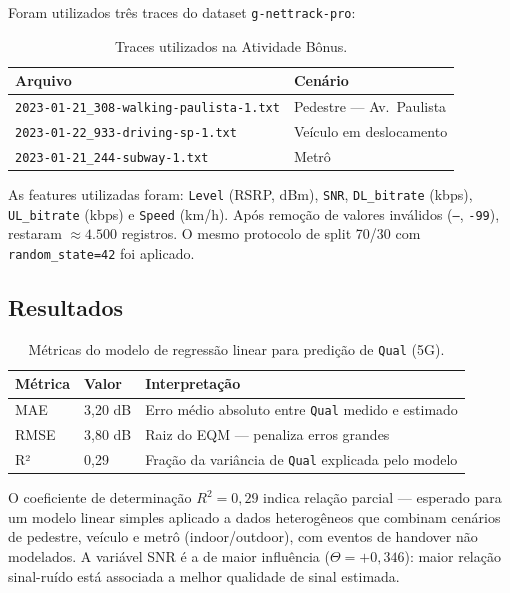 \documentclass[12pt,a4paper]{article}
\begin{document}
Foram utilizados três traces do dataset \texttt{g-nettrack-pro}:

\begin{table}[H]
\centering
\caption{Traces utilizados na Atividade Bônus.}
\label{tab:traces}
\begin{tabular}{ll}
\toprule
\textbf{Arquivo} & \textbf{Cenário} \\
\midrule
\texttt{2023-01-21\_308-walking-paulista-1.txt} & Pedestre --- Av.\ Paulista \\
\texttt{2023-01-22\_933-driving-sp-1.txt}       & Veículo em deslocamento \\
\texttt{2023-01-21\_244-subway-1.txt}           & Metrô \\
\bottomrule
\end{tabular}
\end{table}

As features utilizadas foram: \texttt{Level} (RSRP, dBm), \texttt{SNR},
\texttt{DL\_bitrate} (kbps), \texttt{UL\_bitrate} (kbps) e \texttt{Speed} (km/h).
Após remoção de valores inválidos (\texttt{--}, \texttt{-99}), restaram $\approx 4.500$
registros. O mesmo protocolo de split 70/30 com \texttt{random\_state=42} foi aplicado.

\subsection{Resultados}

\begin{table}[H]
\centering
\caption{Métricas do modelo de regressão linear para predição de \texttt{Qual} (5G).}
\label{tab:bonus_metrics}
\begin{tabular}{llp{7cm}}
\toprule
\textbf{Métrica} & \textbf{Valor} & \textbf{Interpretação} \\
\midrule
MAE  & 3,20 dB & Erro médio absoluto entre \texttt{Qual} medido e estimado \\
RMSE & 3,80 dB & Raiz do EQM --- penaliza erros grandes \\
R²   & 0,29    & Fração da variância de \texttt{Qual} explicada pelo modelo \\
\bottomrule
\end{tabular}
\end{table}

O coeficiente de determinação $R^2 = 0{,}29$ indica relação parcial --- esperado para
um modelo linear simples aplicado a dados heterogêneos que combinam cenários de
pedestre, veículo e metrô (indoor/outdoor), com eventos de handover não modelados.
A variável SNR é a de maior influência ($\Theta = +0{,}346$): maior relação
sinal-ruído está associada a melhor qualidade de sinal estimada.
\end{document}
